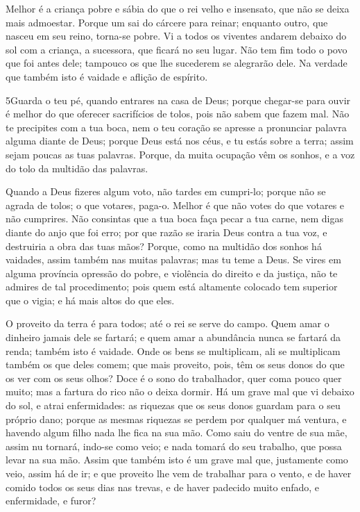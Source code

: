 Melhor é a criança pobre e sábia do que o rei velho e insensato,
que não se deixa mais admoestar. Porque um sai do cárcere
para reinar; enquanto outro, que nasceu em seu reino, torna-se
pobre. Vi a todos os viventes andarem debaixo do sol com a
criança, a sucessora, que ficará no seu lugar. Não tem fim
todo o povo que foi antes dele; tampouco os que lhe sucederem se
alegrarão dele. Na verdade que também isto é vaidade e aflição de
espírito.

\medskip

\lettrine{5} Guarda o teu pé, quando entrares na casa de Deus;
porque chegar-se para ouvir é melhor do que oferecer sacrifícios de
tolos, pois não sabem que fazem mal. Não te precipites com a tua
boca, nem o teu coração se apresse a pronunciar palavra alguma
diante de Deus; porque Deus está nos céus, e tu estás sobre a terra;
assim sejam poucas as tuas palavras. Porque, da muita ocupação
vêm os sonhos, e a voz do tolo da multidão das palavras.

Quando a Deus fizeres algum voto, não tardes em cumpri-lo; porque
não se agrada de tolos; o que votares, paga-o. Melhor é que não
votes do que votares e não cumprires. Não consintas que a tua
boca faça pecar a tua carne, nem digas diante do anjo que foi erro;
por que razão se iraria Deus contra a tua voz, e destruiria a obra
das tuas mãos? Porque, como na multidão dos sonhos há vaidades,
assim também nas muitas palavras; mas tu teme a Deus. Se vires
em alguma província opressão do pobre, e violência do direito e da
justiça, não te admires de tal procedimento; pois quem está
altamente colocado tem superior que o vigia; e há mais altos do que
eles.

O proveito da terra é para todos; até o rei se serve do campo.
Quem amar o dinheiro jamais dele se fartará; e quem amar a
abundância nunca se fartará da renda; também isto é vaidade.
Onde os bens se multiplicam, ali se multiplicam também os que
deles comem; que mais proveito, pois, têm os seus donos do que os
ver com os seus olhos? Doce é o sono do trabalhador, quer
coma pouco quer muito; mas a fartura do rico não o deixa dormir.
Há um grave mal que vi debaixo do sol, e atrai enfermidades:
as riquezas que os seus donos guardam para o seu próprio dano;
porque as mesmas riquezas se perdem por qualquer má ventura,
e havendo algum filho nada lhe fica na sua mão. Como saiu do
ventre de sua mãe, assim nu tornará, indo-se como veio; e nada
tomará do seu trabalho, que possa levar na sua mão. Assim que
também isto é um grave mal que, justamente como veio, assim há de
ir; e que proveito lhe vem de trabalhar para o vento, e de
haver comido todos os seus dias nas trevas, e de haver padecido
muito enfado, e enfermidade, e furor?

